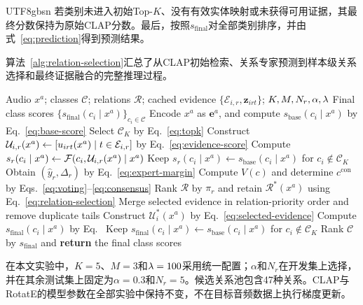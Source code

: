 \begin{CJK*}{UTF8}{gbsn}
若类别未进入初始Top-$K$、没有有效实体映射或未获得可用证据，其最终分数保持为原始CLAP分数。最后，按照$s_{\mathrm{final}}$对全部类别排序，并由式~\eqref{eq:prediction}得到预测结果。

算法~\ref{alg:relation-selection}汇总了从CLAP初始检索、关系专家预测到样本级关系选择和最终证据融合的完整推理过程。

\begin{algorithm}[H]
\caption{Inference with sample-level relation selection and hierarchical evidence fusion}
\label{alg:relation-selection}
\fontsize{7}{10}\selectfont
\begin{algorithmic}[1]
\Require Audio $x^a$; classes $\mathcal C$; relations $\mathcal R$; cached evidence $\{\mathcal E_{i,r},\mathbf z_{irt}\}$; $K,M,N_r,\alpha,\lambda$
\Ensure Final class scores $\{s_{\mathrm{final}}(c_i\mid x^a)\}_{c_i\in\mathcal C}$
\State Encode $x^a$ as $\mathbf e^a$, and compute $s_{\mathrm{base}}(c_i\mid x^a)$ by Eq.~\eqref{eq:base-score}
\State Select $\mathcal C_K$ by Eq.~\eqref{eq:topk}
    \State Construct $\mathcal U_{i,r}(x^a)\gets[u_{irt}(x^a)\mid t\in\mathcal E_{i,r}]$ by Eq.~\eqref{eq:evidence-score}
    \State Compute $s_r(c_i\mid x^a)\gets\mathcal F(c_i,\mathcal U_{i,r}(x^a)\mid x^a)$
  \EndFor
  \State Keep $s_r(c_i\mid x^a)\gets s_{\mathrm{base}}(c_i\mid x^a)$ for $c_i\notin\mathcal C_K$
  \State Obtain $(\hat y_r,\Delta_r)$ by Eq.~\eqref{eq:expert-margin}
\EndFor
\State Compute $V(c)$ and determine $c^{\mathrm{con}}$ by Eqs.~\eqref{eq:voting}--\eqref{eq:consensus}
\State Rank $\mathcal R$ by $\pi_r$ and retain $\mathcal R^*(x^a)$ using Eq.~\eqref{eq:relation-selection}
  \State Merge selected evidence in relation-priority order and remove duplicate tails
  \State Construct $\mathcal U_i^*(x^a)$ by Eq.~\eqref{eq:selected-evidence}
  \State Compute $s_{\mathrm{final}}(c_i\mid x^a)$ by Eq.~\methodrevision{\eqref{eq:unified-fusion}}
\EndFor
\State Keep $s_{\mathrm{final}}(c_i\mid x^a)\gets s_{\mathrm{base}}(c_i\mid x^a)$ for $c_i\notin\mathcal C_K$
\State Rank $\mathcal C$ by $s_{\mathrm{final}}$ and \textbf{return} the final class scores
\end{algorithmic}
\end{algorithm}

在本文实验中，$K=5$、$M=3$和$\lambda=100$采用统一配置；$\alpha$和$N_r$在开发集上选择，并在其余测试集上固定为$\alpha=0.3$和$N_r=5$。候选关系池包含47种关系。CLAP与RotatE的模型参数在全部实验中保持不变，不在目标音频数据上执行梯度更新。

\end{CJK*}
